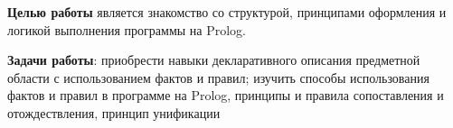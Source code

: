 \Introduction

\textbf{Целью работы} является знакомство со структурой, принципами оформления и логикой выполнения программы на Prolog.

\textbf{Задачи работы}: приобрести навыки декларативного описания предметной области с использованием фактов и правил; изучить способы использования фактов и правил в программе на Prolog, принципы  и правила сопоставления и отождествления, принцип унификации

